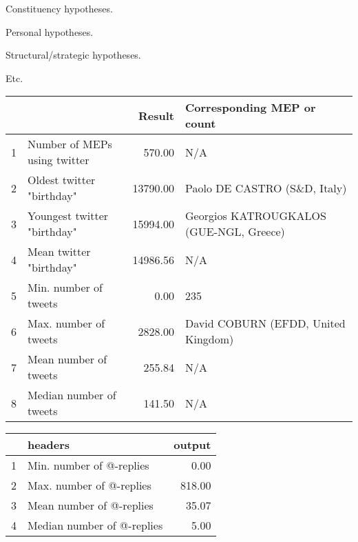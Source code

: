 \documentclass{article}\usepackage[]{graphicx}\usepackage[]{color}
\begin{document}
		Constituency hypotheses.
		
		Personal hypotheses.
		
		Structural/strategic hypotheses.
		
		Etc.


\begin{table}[ht]
\centering
\begin{tabular}{rlrl}
  \hline
 &  & Result & Corresponding MEP or count \\ 
  \hline
1 & Number of MEPs using twitter & 570.00 & N/A \\ 
  2 & Oldest twitter "birthday" & 13790.00 & Paolo DE CASTRO (S\&D, Italy) \\ 
  3 & Youngest twitter "birthday" & 15994.00 & Georgios KATROUGKALOS (GUE-NGL, Greece) \\ 
  4 & Mean twitter "birthday" & 14986.56 & N/A \\ 
  5 & Min. number of tweets & 0.00 & 235 \\ 
  6 & Max. number of tweets & 2828.00 & David COBURN (EFDD, United Kingdom) \\ 
  7 & Mean number of tweets & 255.84 & N/A \\ 
  8 & Median number of tweets & 141.50 & N/A \\ 
   \hline
\end{tabular}
\end{table}


\begin{table}[ht]
\centering
\begin{tabular}{rlr}
  \hline
 & headers & output \\ 
  \hline
1 & Min. number of @-replies & 0.00 \\ 
  2 & Max. number of @-replies & 818.00 \\ 
  3 & Mean number of @-replies & 35.07 \\ 
  4 & Median number of @-replies & 5.00 \\ 
   \hline
\end{tabular}
\end{table}
\end{document}
